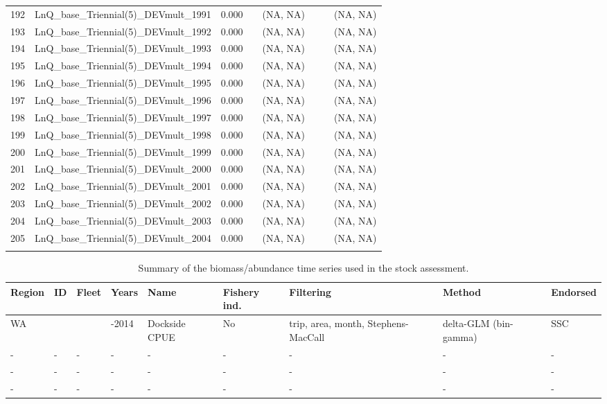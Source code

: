 \documentclass[12pt,]{article}
\begin{document}
\begin{landscape}
\begin{longtable}{rlrrcccl}
  192 & LnQ\_base\_Triennial(5)\_DEVmult\_1991 & 0.000 &  & (NA, NA) &  &  &  (NA, NA) \\ 
  193 & LnQ\_base\_Triennial(5)\_DEVmult\_1992 & 0.000 &  & (NA, NA) &  &  &  (NA, NA) \\ 
  194 & LnQ\_base\_Triennial(5)\_DEVmult\_1993 & 0.000 &  & (NA, NA) &  &  &  (NA, NA) \\ 
  195 & LnQ\_base\_Triennial(5)\_DEVmult\_1994 & 0.000 &  & (NA, NA) &  &  &  (NA, NA) \\ 
  196 & LnQ\_base\_Triennial(5)\_DEVmult\_1995 & 0.000 &  & (NA, NA) &  &  &  (NA, NA) \\ 
  197 & LnQ\_base\_Triennial(5)\_DEVmult\_1996 & 0.000 &  & (NA, NA) &  &  &  (NA, NA) \\ 
  198 & LnQ\_base\_Triennial(5)\_DEVmult\_1997 & 0.000 &  & (NA, NA) &  &  &  (NA, NA) \\ 
  199 & LnQ\_base\_Triennial(5)\_DEVmult\_1998 & 0.000 &  & (NA, NA) &  &  &  (NA, NA) \\ 
  200 & LnQ\_base\_Triennial(5)\_DEVmult\_1999 & 0.000 &  & (NA, NA) &  &  &  (NA, NA) \\ 
  201 & LnQ\_base\_Triennial(5)\_DEVmult\_2000 & 0.000 &  & (NA, NA) &  &  &  (NA, NA) \\ 
  202 & LnQ\_base\_Triennial(5)\_DEVmult\_2001 & 0.000 &  & (NA, NA) &  &  &  (NA, NA) \\ 
  203 & LnQ\_base\_Triennial(5)\_DEVmult\_2002 & 0.000 &  & (NA, NA) &  &  &  (NA, NA) \\ 
  204 & LnQ\_base\_Triennial(5)\_DEVmult\_2003 & 0.000 &  & (NA, NA) &  &  &  (NA, NA) \\ 
  205 & LnQ\_base\_Triennial(5)\_DEVmult\_2004 & 0.000 &  & (NA, NA) &  &  &  (NA, NA) \\ 
   \hline
\hline
\label{tab:model_params}
\end{longtable}
\end{landscape}

\newpage

\begin{table}[ht]
\centering
\caption{Summary of the biomass/abundance
                                              time series used in the stock
                                              assessment.} 
\label{tab:Index_summary}
\begin{tabular}{>{\centering}p{.4in}>{\centering}p{.3in}>{\centering}p{.3in}>{\centering}p{.3in}>{\centering}p{.6in}>{\centering}p{.5in}>{\centering}p{.8in}>{\centering}p{.8in}>{\centering}p{.5in}}
  \hline
Region & ID & Fleet & Years & Name & Fishery ind. & Filtering & Method & Endorsed \\ 
  \hline
WA & 1 & 4 & 1981-2014 & Dockside CPUE & No & trip, area, month, Stephens-MacCall & delta-GLM (bin-gamma) & SSC \\ 
  - & - & - & - & - & - & - & - & - \\ 
  - & - & - & - & - & - & - & - & - \\ 
  - & - & - & - & - & - & - & - & - \\ 
   \hline
\end{tabular}
\end{table}
\end{document}
